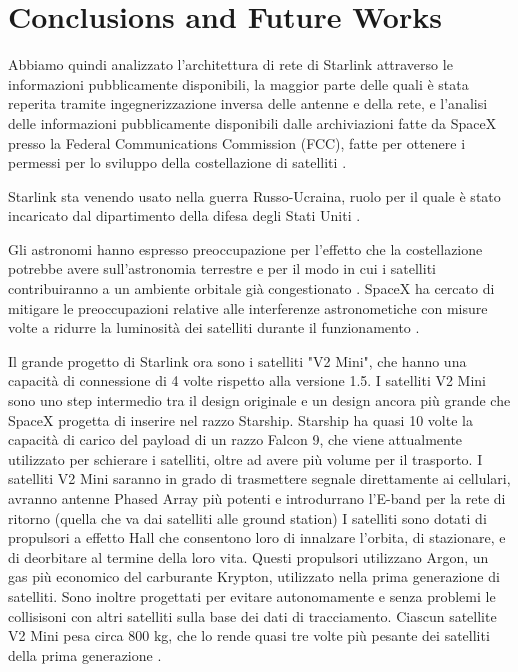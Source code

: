 
\chapter{Conclusions and Future Works}
\label{chp:conclusions}

Abbiamo quindi analizzato l'architettura di rete di Starlink attraverso le informazioni pubblicamente disponibili, la maggior parte delle quali è stata reperita tramite ingegnerizzazione inversa delle antenne e della rete, e l'analisi delle informazioni pubblicamente disponibili dalle archiviazioni fatte da SpaceX presso la Federal Communications Commission (FCC), fatte per ottenere i permessi per lo sviluppo della costellazione di satelliti \cite{jonathan_mcdowell_section_nodate}.

Starlink sta venendo usato nella guerra Russo-Ucraina, ruolo per il quale è stato incaricato dal dipartimento della difesa degli Stati Uniti \cite{amanda_macias_pentagon_2023}.

Gli astronomi hanno espresso preoccupazione per l'effetto che la costellazione potrebbe avere sull'astronomia terrestre e per il modo in cui i satelliti contribuiranno a un ambiente orbitale già congestionato \cite{nadia_drake_will_2019}.
SpaceX ha cercato di mitigare le preoccupazioni relative alle interferenze astronometiche con misure volte a ridurre la luminosità dei satelliti durante il funzionamento \cite{starlink_brightness_nodate}.

Il grande progetto di Starlink ora sono i satelliti "V2 Mini", che hanno una capacità di connessione di 4 volte rispetto alla versione 1.5.
I satelliti V2 Mini sono uno step intermedio tra il design originale e un design ancora più grande che SpaceX progetta di inserire nel razzo Starship.
Starship ha quasi 10 volte la capacità di carico del payload di un razzo Falcon 9, che viene attualmente utilizzato per schierare i satelliti,  oltre ad avere più volume per il trasporto.
I satelliti V2 Mini saranno in grado di trasmettere segnale direttamente ai cellulari, avranno antenne Phased Array più potenti e introdurrano l'E-band per la rete di ritorno (quella che va dai satelliti alle ground station)
I satelliti sono dotati di propulsori a effetto Hall che consentono loro di innalzare l'orbita, di stazionare, e di deorbitare al termine della loro vita.
Questi propulsori utilizzano Argon, un gas più economico del carburante Krypton, utilizzato nella prima generazione di satelliti.
Sono inoltre progettati per evitare autonomamente e senza problemi le collisisoni con altri satelliti sulla base dei dati di tracciamento.
Ciascun satellite V2 Mini pesa circa 800 kg, che lo rende quasi tre volte più pesante dei satelliti della prima generazione \cite{starlink_secon_nodate}.

